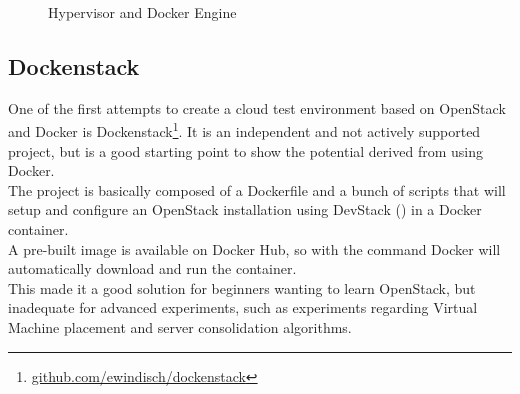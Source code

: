 \begin{figure}[!ht]
\label{fig:docker_vm}
\caption{Hypervisor and Docker Engine}
\end{figure}


\subsection{Dockenstack}
\label{sub:sota_dockenstack}
One of the first attempts to create a cloud test environment based on OpenStack and Docker is Dockenstack\footnote{\url{github.com/ewindisch/dockenstack}}. It is an independent and not actively supported project, but is a good starting point to show the potential derived from using Docker.\\
The project is basically composed of a Dockerfile and a bunch of scripts that will setup and configure an OpenStack installation using DevStack () in a Docker container.\\
A pre-built image is available on Docker Hub, so with the command  Docker will automatically download and run the container.\\
This made it a good solution for beginners wanting to learn OpenStack, but inadequate for advanced experiments, such as experiments regarding Virtual Machine placement and server consolidation algorithms.

